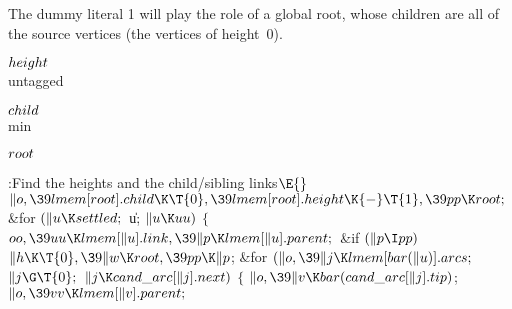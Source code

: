 The dummy literal 1 will play the role of a global root, whose children
are all of the source vertices (the vertices of height~0).

\Y\B\4\D$\\{height}$ \5
\\{untagged}\par
\B\4\D$\\{child}$ \5
\\{min}\par
\B\4\D$\\{root}$ \5
\par
\Y\B\4:Find the heights and the child/sibling links\X${}\E{}$\6
$\|o,\39\\{lmem}[\\{root}].\\{child}\K\T{0},\39\\{lmem}[\\{root}].\\{height}%
\K{-}\T{1},\39\\{pp}\K\\{root};{}$\6
\&{for} ${}(\|u\K\\{settled};{}$ \|u; ${}\|u\K\\{uu}){}$\5
${}\{{}$\1\6
${}\\{oo},\39\\{uu}\K\\{lmem}[\|u].\\{link},\39\|p\K\\{lmem}[\|u].%
\\{parent};{}$\6
\&{if} ${}(\|p\I\\{pp}){}$\1\5
${}\|h\K\T{0},\39\|w\K\\{root},\39\\{pp}\K\|p{}$;\2\6
\&{for} ${}(\|o,\39\|j\K\\{lmem}[\\{bar}(\|u)].\\{arcs};{}$ ${}\|j\G\T{0};{}$
${}\|j\K\\{cand\_arc}[\|j].\\{next}){}$\5
${}\{{}$\1\6
${}\|o,\39\|v\K\\{bar}(\\{cand\_arc}[\|j].\\{tip}){}$;\6
${}\|o,\39\\{vv}\K\\{lmem}[\|v].\\{parent};{}$\6
